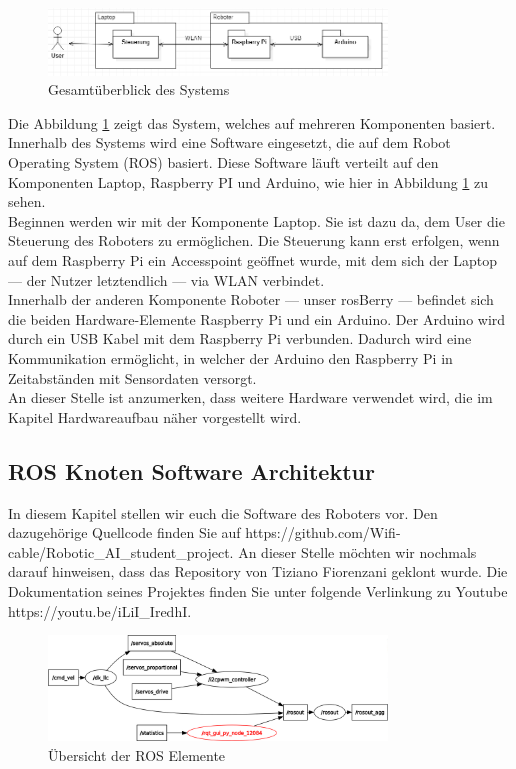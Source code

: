 \documentclass[conference]{IEEEtran}
\begin{document}
\begin{figure}[!ht]
	\centering
	\includegraphics[width=9cm]{img/Gesamtsystem.PNG}
	\caption{Gesamtüberblick des Systems}
	\label{Gesamtzusammenhang}
\end{figure}
Die Abbildung \ref{Gesamtzusammenhang} zeigt das System, welches auf mehreren Komponenten basiert.
Innerhalb des Systems wird eine Software eingesetzt, die auf dem Robot Operating System (ROS) basiert.
Diese Software läuft verteilt auf den Komponenten Laptop, Raspberry PI und Arduino, wie hier in Abbildung \ref{Gesamtzusammenhang} zu sehen.
\\
Beginnen werden wir mit der Komponente Laptop.
Sie ist dazu da, dem User die Steuerung des Roboters zu ermöglichen.
Die Steuerung kann erst erfolgen, wenn auf dem Raspberry Pi ein Accesspoint geöffnet wurde, mit dem sich der Laptop — der Nutzer letztendlich — via WLAN verbindet.
\\
Innerhalb der anderen Komponente Roboter — unser rosBerry — befindet sich die beiden Hardware-Elemente Raspberry Pi und ein Arduino.
Der Arduino wird durch ein USB Kabel mit dem Raspberry Pi verbunden.
Dadurch wird eine Kommunikation ermöglicht, in welcher der Arduino den Raspberry Pi in Zeitabständen mit Sensordaten versorgt.
\\
An dieser Stelle ist anzumerken, dass weitere Hardware verwendet wird, die im Kapitel Hardwareaufbau näher vorgestellt wird.

\subsection{ROS Knoten Software Architektur}%
In diesem Kapitel stellen wir euch die Software des Roboters vor.
Den dazugehörige Quellcode finden Sie auf https://github.com/Wifi-cable/Robotic\_AI\_student\_project.
An dieser Stelle möchten wir nochmals darauf hinweisen, dass das Repository von Tiziano Fiorenzani geklont wurde.
Die Dokumentation seines Projektes finden Sie unter folgende Verlinkung zu Youtube https://youtu.be/iLiI\_IredhI.

\begin{figure}[!ht] 
	\centering
	\includegraphics[width=9cm]{img/rosgraph.png}
	\caption{Übersicht der ROS Elemente}
	\label{rosgraph}
\end{figure}
\end{document}
